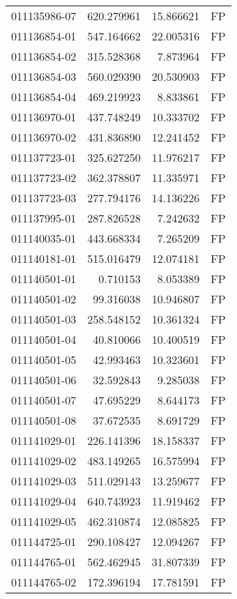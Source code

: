 \begin{tabular}{lrrl}
011135986-07 &  620.279961 &    15.866621 &   FP \\
011136854-01 &  547.164662 &    22.005316 &   FP \\
011136854-02 &  315.528368 &     7.873964 &   FP \\
011136854-03 &  560.029390 &    20.530903 &   FP \\
011136854-04 &  469.219923 &     8.833861 &   FP \\
011136970-01 &  437.748249 &    10.333702 &   FP \\
011136970-02 &  431.836890 &    12.241452 &   FP \\
011137723-01 &  325.627250 &    11.976217 &   FP \\
011137723-02 &  362.378807 &    11.335971 &   FP \\
011137723-03 &  277.794176 &    14.136226 &   FP \\
011137995-01 &  287.826528 &     7.242632 &   FP \\
011140035-01 &  443.668334 &     7.265209 &   FP \\
011140181-01 &  515.016479 &    12.074181 &   FP \\
011140501-01 &    0.710153 &     8.053389 &   FP \\
011140501-02 &   99.316038 &    10.946807 &   FP \\
011140501-03 &  258.548152 &    10.361324 &   FP \\
011140501-04 &   40.810066 &    10.400519 &   FP \\
011140501-05 &   42.993463 &    10.323601 &   FP \\
011140501-06 &   32.592843 &     9.285038 &   FP \\
011140501-07 &   47.695229 &     8.644173 &   FP \\
011140501-08 &   37.672535 &     8.691729 &   FP \\
011141029-01 &  226.141396 &    18.158337 &   FP \\
011141029-02 &  483.149265 &    16.575994 &   FP \\
011141029-03 &  511.029143 &    13.259677 &   FP \\
011141029-04 &  640.743923 &    11.919462 &   FP \\
011141029-05 &  462.310874 &    12.085825 &   FP \\
011144725-01 &  290.108427 &    12.094267 &   FP \\
011144765-01 &  562.462945 &    31.807339 &   FP \\
011144765-02 &  172.396194 &    17.781591 &   FP \\

\end{tabular}
